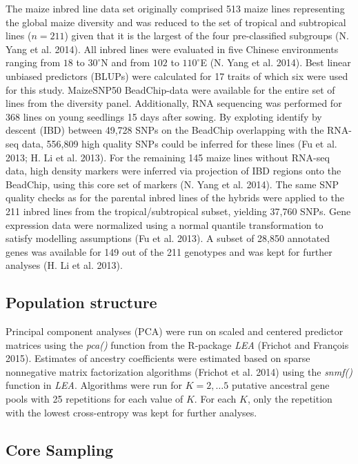 \documentclass[]{elsarticle} %
\begin{document}
The maize inbred line data set originally comprised 513 maize lines
representing the global maize diversity and was reduced to the set of
tropical and subtropical lines (\(n = 211\)) given that it is the
largest of the four pre-classified subgroups (N. Yang et al. 2014). All
inbred lines were evaluated in five Chinese environments ranging from
\(18\) to \(30^{\circ}\)N and from \(102\) to \(110^{\circ}\)E (N. Yang
et al. 2014). Best linear unbiased predictors (BLUPs) were calculated
for 17 traits of which six were used for this study. MaizeSNP50
BeadChip-data were available for the entire set of lines from the
diversity panel. Additionally, RNA sequencing was performed for 368
lines on young seedlings 15 days after sowing. By exploting identify by
descent (IBD) between 49,728 SNPs on the BeadChip overlapping with the
RNA-seq data, 556,809 high quality SNPs could be inferred for these
lines (Fu et al. 2013; H. Li et al. 2013). For the remaining 145 maize
lines without RNA-seq data, high density markers were inferred via
projection of IBD regions onto the BeadChip, using this core set of
markers (N. Yang et al. 2014). The same SNP quality checks as for the
parental inbred lines of the hybrids were applied to the 211 inbred
lines from the tropical/subtropical subset, yielding 37,760 SNPs. Gene
expression data were normalized using a normal quantile transformation
to satisfy modelling assumptions (Fu et al. 2013). A subset of 28,850
annotated genes was available for 149 out of the 211 genotypes and was
kept for further analyses (H. Li et al. 2013).

\subsection{Population structure}\label{population-structure}

Principal component analyses (PCA) were run on scaled and centered
predictor matrices using the \emph{pca()} function from the R-package
\emph{LEA} (Frichot and François 2015). Estimates of ancestry
coefficients were estimated based on sparse nonnegative matrix
factorization algorithms (Frichot et al. 2014) using the \emph{snmf()}
function in \emph{LEA}. Algorithms were run for \(K=2, \dots 5\)
putative ancestral gene pools with 25 repetitions for each value of
\(K\). For each \(K\), only the repetition with the lowest cross-entropy
was kept for further analyses.

\subsection{Core Sampling}\label{core-sampling}
\end{document}

